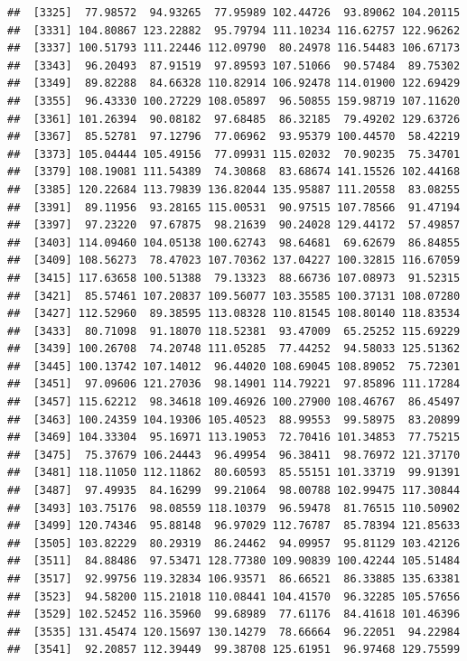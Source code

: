\documentclass[
]{article}
\begin{document}
\begin{verbatim}
##  [3325]  77.98572  94.93265  77.95989 102.44726  93.89062 104.20115
##  [3331] 104.80867 123.22882  95.79794 111.10234 116.62757 122.96262
##  [3337] 100.51793 111.22446 112.09790  80.24978 116.54483 106.67173
##  [3343]  96.20493  87.91519  97.89593 107.51066  90.57484  89.75302
##  [3349]  89.82288  84.66328 110.82914 106.92478 114.01900 122.69429
##  [3355]  96.43330 100.27229 108.05897  96.50855 159.98719 107.11620
##  [3361] 101.26394  90.08182  97.68485  86.32185  79.49202 129.63726
##  [3367]  85.52781  97.12796  77.06962  93.95379 100.44570  58.42219
##  [3373] 105.04444 105.49156  77.09931 115.02032  70.90235  75.34701
##  [3379] 108.19081 111.54389  74.30868  83.68674 141.15526 102.44168
##  [3385] 120.22684 113.79839 136.82044 135.95887 111.20558  83.08255
##  [3391]  89.11956  93.28165 115.00531  90.97515 107.78566  91.47194
##  [3397]  97.23220  97.67875  98.21639  90.24028 129.44172  57.49857
##  [3403] 114.09460 104.05138 100.62743  98.64681  69.62679  86.84855
##  [3409] 108.56273  78.47023 107.70362 137.04227 100.32815 116.67059
##  [3415] 117.63658 100.51388  79.13323  88.66736 107.08973  91.52315
##  [3421]  85.57461 107.20837 109.56077 103.35585 100.37131 108.07280
##  [3427] 112.52960  89.38595 113.08328 110.81545 108.80140 118.83534
##  [3433]  80.71098  91.18070 118.52381  93.47009  65.25252 115.69229
##  [3439] 100.26708  74.20748 111.05285  77.44252  94.58033 125.51362
##  [3445] 100.13742 107.14012  96.44020 108.69045 108.89052  75.72301
##  [3451]  97.09606 121.27036  98.14901 114.79221  97.85896 111.17284
##  [3457] 115.62212  98.34618 109.46926 100.27900 108.46767  86.45497
##  [3463] 100.24359 104.19306 105.40523  88.99553  99.58975  83.20899
##  [3469] 104.33304  95.16971 113.19053  72.70416 101.34853  77.75215
##  [3475]  75.37679 106.24443  96.49954  96.38411  98.76972 121.37170
##  [3481] 118.11050 112.11862  80.60593  85.55151 101.33719  99.91391
##  [3487]  97.49935  84.16299  99.21064  98.00788 102.99475 117.30844
##  [3493] 103.75176  98.08559 118.10379  96.59478  81.76515 110.50902
##  [3499] 120.74346  95.88148  96.97029 112.76787  85.78394 121.85633
##  [3505] 103.82229  80.29319  86.24462  94.09957  95.81129 103.42126
##  [3511]  84.88486  97.53471 128.77380 109.90839 100.42244 105.51484
##  [3517]  92.99756 119.32834 106.93571  86.66521  86.33885 135.63381
##  [3523]  94.58200 115.21018 110.08441 104.41570  96.32285 105.57656
##  [3529] 102.52452 116.35960  99.68989  77.61176  84.41618 101.46396
##  [3535] 131.45474 120.15697 130.14279  78.66664  96.22051  94.22984
##  [3541]  92.20857 112.39449  99.38708 125.61951  96.97468 129.75599

\end{verbatim}
\end{document}
